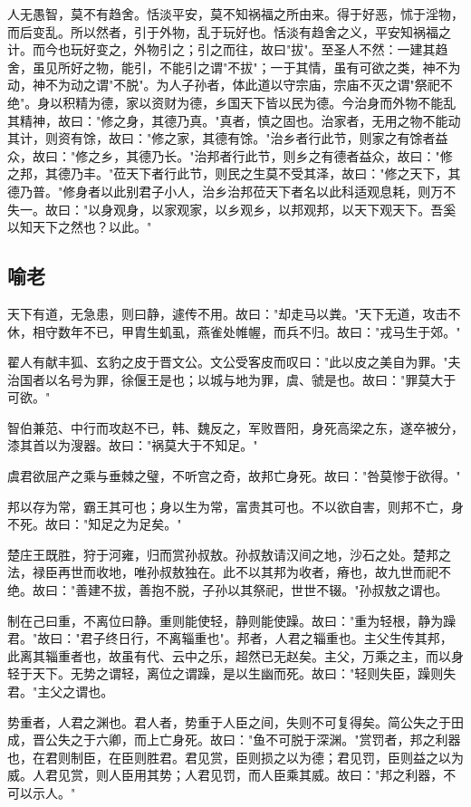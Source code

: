 \documentclass[]{article}
\begin{document}
人无愚智，莫不有趋舍。恬淡平安，莫不知祸福之所由来。得于好恶，怵于淫物，而后变乱。所以然者，引于外物，乱于玩好也。恬淡有趋舍之义，平安知祸福之计。而今也玩好变之，外物引之；引之而往，故曰"拔"。至圣人不然：一建其趋舍，虽见所好之物，能引，不能引之谓"不拔"；一于其情，虽有可欲之类，神不为动，神不为动之谓"不脱"。为人子孙者，体此道以守宗庙，宗庙不灭之谓"祭祀不绝"。身以积精为德，家以资财为德，乡国天下皆以民为德。今治身而外物不能乱其精神，故曰："修之身，其德乃真。"真者，慎之固也。治家者，无用之物不能动其计，则资有馀，故曰："修之家，其德有馀。"治乡者行此节，则家之有馀者益众，故曰："修之乡，其德乃长。"治邦者行此节，则乡之有德者益众，故曰："修之邦，其德乃丰。"莅天下者行此节，则民之生莫不受其泽，故曰："修之天下，其德乃普。"修身者以此别君子小人，治乡治邦莅天下者名以此科适观息耗，则万不失一。故曰："以身观身，以家观家，以乡观乡，以邦观邦，以天下观天下。吾奚以知天下之然也？以此。"

\hypertarget{header-n970}{%
\subsection{喻老}\label{header-n970}}

天下有道，无急患，则曰静，遽传不用。故曰："却走马以粪。"天下无道，攻击不休，相守数年不已，甲胄生虮虱，燕雀处帷幄，而兵不归。故曰："戎马生于郊。"

翟人有献丰狐、玄豹之皮于晋文公。文公受客皮而叹曰："此以皮之美自为罪。"夫治国者以名号为罪，徐偃王是也；以城与地为罪，虞、虢是也。故曰："罪莫大于可欲。"

智伯兼范、中行而攻赵不已，韩、魏反之，军败晋阳，身死高梁之东，遂卒被分，漆其首以为溲器。故曰："祸莫大于不知足。"

虞君欲屈产之乘与垂棘之璧，不听宫之奇，故邦亡身死。故曰："咎莫惨于欲得。"

邦以存为常，霸王其可也；身以生为常，富贵其可也。不以欲自害，则邦不亡，身不死。故曰："知足之为足矣。"

楚庄王既胜，狩于河雍，归而赏孙叔敖。孙叔敖请汉间之地，沙石之处。楚邦之法，禄臣再世而收地，唯孙叔敖独在。此不以其邦为收者，瘠也，故九世而祀不绝。故曰："善建不拔，善抱不脱，子孙以其祭祀，世世不辍。"孙叔敖之谓也。

制在己曰重，不离位曰静。重则能使轻，静则能使躁。故曰："重为轻根，静为躁君。"故曰："君子终日行，不离辎重也"。邦者，人君之辎重也。主父生传其邦，此离其辎重者也，故虽有代、云中之乐，超然已无赵矣。主父，万乘之主，而以身轻于天下。无势之谓轻，离位之谓躁，是以生幽而死。故曰："轻则失臣，躁则失君。"主父之谓也。

势重者，人君之渊也。君人者，势重于人臣之间，失则不可复得矣。简公失之于田成，晋公失之于六卿，而上亡身死。故曰："鱼不可脱于深渊。"赏罚者，邦之利器也，在君则制臣，在臣则胜君。君见赏，臣则损之以为德；君见罚，臣则益之以为威。人君见赏，则人臣用其势；人君见罚，而人臣乘其威。故曰："邦之利器，不可以示人。"
\end{document}
